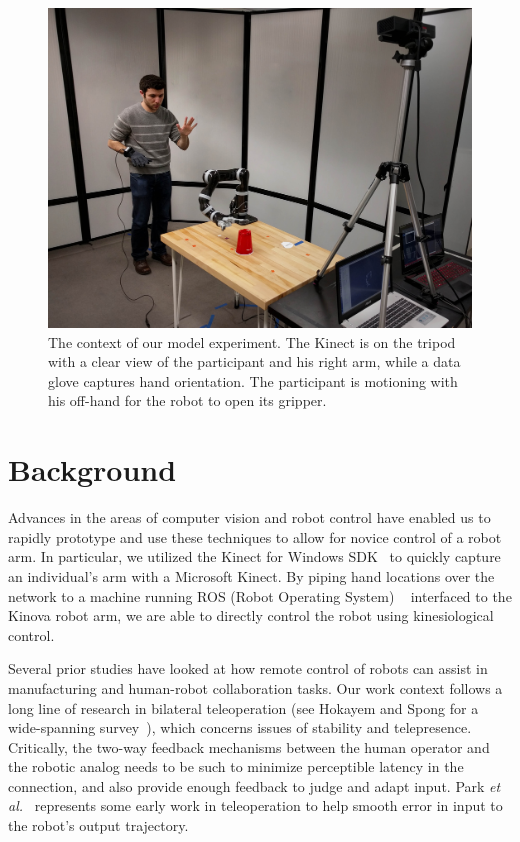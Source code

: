 \documentclass{sigchi}
\begin{document}
\begin{figure}[t]
	\centering
	\includegraphics[width=\columnwidth]{../Data/Figures/kinesiological_demo_2.jpg}
	\caption{The context of our model experiment.  The Kinect is on the tripod with a clear view of the participant and his right arm, while a data glove captures hand orientation.  The participant is motioning with his off-hand for the robot to open its gripper.}
	 \label{fig:demo}
\end{figure} 

\section{Background}

Advances in the areas of computer vision and robot control have enabled us to rapidly prototype and use these techniques to allow for novice control of a robot arm.  In particular, we utilized the Kinect for Windows SDK~\cite{Kinect} to quickly capture an individual's arm with a Microsoft Kinect.  By piping hand locations over the network to a machine running ROS (Robot Operating System) ~\cite{ROS} interfaced to the Kinova robot arm, we are able to directly control the robot using kinesiological control.

Several prior studies have looked at how remote control of robots can assist in manufacturing and human-robot collaboration tasks. Our work context follows a long line of research in bilateral teleoperation (see Hokayem and Spong for a wide-spanning survey~\cite{hokayem2006bilateral}), which concerns issues of stability and telepresence.  Critically, the two-way feedback mechanisms between the human operator and the robotic analog needs to be such to minimize perceptible latency in the connection, and also provide enough feedback to judge and adapt input.  Park \emph{et al.}~\cite{park2003robust} represents some early work in teleoperation to help smooth error in input to the robot's output trajectory.  
\end{document}
